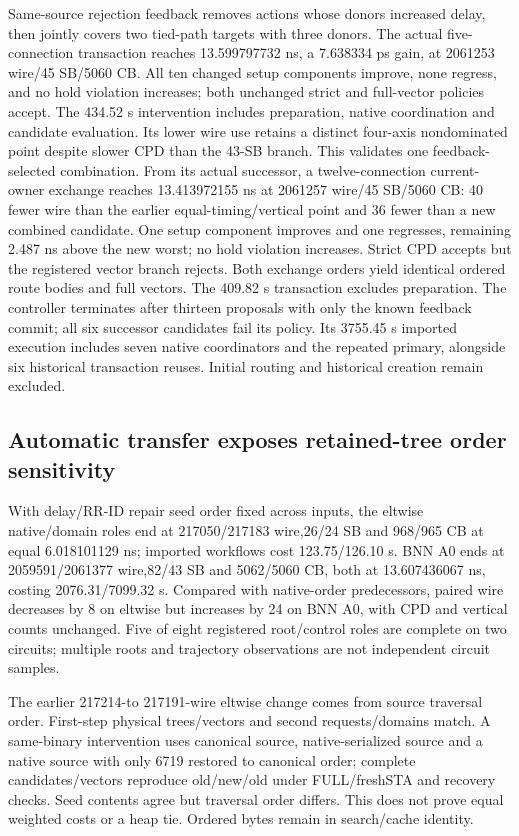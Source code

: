 \documentclass[conference,10pt]{IEEEtran}
\begin{document}
Same-source rejection feedback removes actions whose donors increased delay, then jointly covers two tied-path targets with three donors. The actual five-connection transaction reaches 13.599797732 ns, a 7.638334 ps gain, at 2061253 wire/45 SB/5060 CB. All ten changed setup components improve, none regress, and no hold violation increases; both unchanged strict and full-vector policies accept. The 434.52 s intervention includes preparation, native coordination and candidate evaluation. Its lower wire use retains a distinct four-axis nondominated point despite slower CPD than the 43-SB branch. This validates one feedback-selected combination. From its actual successor, a twelve-connection current-owner exchange reaches 13.413972155 ns at 2061257 wire/45 SB/5060 CB: 40 fewer wire than the earlier equal-timing/vertical point and 36 fewer than a new combined candidate. One setup component improves and one regresses, remaining 2.487 ns above the new worst; no hold violation increases. Strict CPD accepts but the registered vector branch rejects. Both exchange orders yield identical ordered route bodies and full vectors. The 409.82 s transaction excludes preparation. The controller terminates after thirteen proposals with only the known feedback commit; all six successor candidates fail its policy. Its 3755.45 s imported execution includes seven native coordinators and the repeated primary, alongside six historical transaction reuses. Initial routing and historical creation remain excluded.

\subsection{Automatic transfer exposes retained-tree order sensitivity}
With delay/RR-ID repair seed order fixed across inputs, the eltwise native/domain roles end at 217050/217183 wire,26/24 SB and 968/965 CB at equal 6.018101129 ns; imported workflows cost 123.75/126.10 s. BNN A0 ends at 2059591/2061377 wire,82/43 SB and 5062/5060 CB, both at 13.607436067 ns, costing 2076.31/7099.32 s. Compared with native-order predecessors, paired wire decreases by 8 on eltwise but increases by 24 on BNN A0, with CPD and vertical counts unchanged. Five of eight registered root/control roles are complete on two circuits; multiple roots and trajectory observations are not independent circuit samples.

The earlier 217214-to 217191-wire eltwise change comes from source traversal order. First-step physical trees/vectors and second requests/domains match. A same-binary intervention uses canonical source, native-serialized source and a native source with only 6719 restored to canonical order; complete candidates/vectors reproduce old/new/old under FULL/freshSTA and recovery checks. Seed contents agree but traversal order differs. This does not prove equal weighted costs or a heap tie. Ordered bytes remain in search/cache identity.
\end{document}
